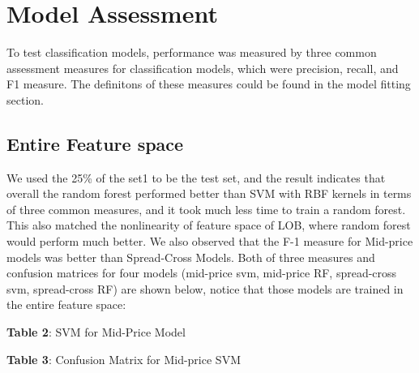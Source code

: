\documentclass[11pt]{article}
\begin{document}
\section{Model Assessment}
To test classification models, performance was measured by three common assessment measures for classification models, which were precision, recall, and F1 measure. The definitons of these measures could be found in the model fitting section.
\subsection{Entire Feature space}
We used the 25\% of the set1 to be the test set, and the result indicates that overall the random forest performed better than SVM with RBF kernels in terms of three common measures, and it took much less time to train a random forest. This also matched the nonlinearity of feature space of LOB, where random forest would perform much better. We also observed that the F-1 measure for Mid-price models was better than Spread-Cross Models. Both of three measures and confusion matrices for four models (mid-price svm, mid-price RF, spread-cross svm, spread-cross RF) are shown below, notice that those models are trained in the entire feature space:
\begin{multicols}{2}
\begin{center}
\renewcommand{\arraystretch}{1.4}

\vspace{0.5 cm}
\small \textbf{Table 2}: SVM for Mid-Price Model
\end{center}

\begin{center}
\renewcommand{\arraystretch}{1.4}

\vspace{0.5 cm}
\small \textbf{Table 3}: Confusion Matrix for Mid-price SVM
\end{center}

\end{multicols}
\end{document}
